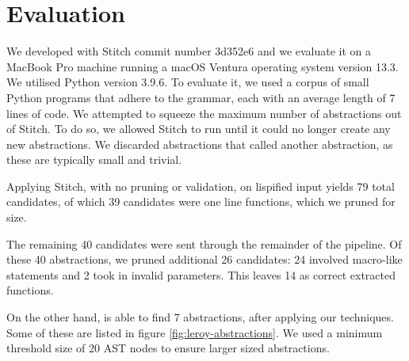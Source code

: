 \section{Evaluation}
\label{sec:eval}


We developed \toolname with Stitch commit number 3d352e6 
and we evaluate it on a 
MacBook Pro machine running a macOS Ventura operating system version 13.3. We utilised Python version 3.9.6.
To evaluate it, we used a corpus of \corpusSize small Python programs 
that adhere to the \ptwo{} grammar, each with an average length of 7 lines of code. We attempted to squeeze the maximum number of abstractions out of Stitch. To do so, we allowed Stitch to run until it could no longer create any new abstractions. We discarded abstractions that called another abstraction, as these are typically small and trivial.

Applying Stitch, with no pruning or validation, on lispified input yields 79 total candidates, of which 39 candidates were one line functions, which we pruned for size. 

The remaining 40 candidates were sent through the remainder of the \toolname{} pipeline.  Of these 40 abstractions, we pruned additional 26 candidates: 24 involved macro-like statements and 2 took in invalid parameters.  This leaves 14 as correct extracted functions.

On the other hand, \toolname is able to find 7 abstractions, after applying our techniques. Some of these are listed in figure \ref{fig:leroy-abstractions}. We used a minimum threshold size of 20 AST nodes to ensure larger sized abstractions. 





